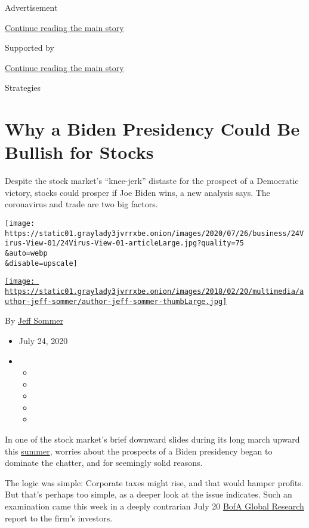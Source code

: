 Advertisement

\protect\hyperlink{after-top}{Continue reading the main story}

Supported by

\protect\hyperlink{after-sponsor}{Continue reading the main story}

Strategies

\hypertarget{why-a-biden-presidency-could-be-bullish-for-stocks}{%
\section{Why a Biden Presidency Could Be Bullish for
Stocks}\label{why-a-biden-presidency-could-be-bullish-for-stocks}}

Despite the stock market's ``knee-jerk'' distaste for the prospect of a
Democratic victory, stocks could prosper if Joe Biden wins, a new
analysis says. The coronavirus and trade are two big factors.

\texttt{[image: https://static01.graylady3jvrrxbe.onion/images/2020/07/26/business/24Virus-View-01/24Virus-View-01-articleLarge.jpg?quality=75\\\&auto=webp\\\&disable=upscale]}

\href{https://www.nytimes3xbfgragh.onion/by/jeff-sommer}{\texttt{[image: https://static01.graylady3jvrrxbe.onion/images/2018/02/20/multimedia/author-jeff-sommer/author-jeff-sommer-thumbLarge.jpg]}}

By \href{https://www.nytimes3xbfgragh.onion/by/jeff-sommer}{Jeff Sommer}

\begin{itemize}
\item
  July 24, 2020
\item
  \begin{itemize}
  \item
  \item
  \item
  \item
  \item
  \end{itemize}
\end{itemize}

In one of the stock market's brief downward slides during its long march
upward this
\href{https://www.nytimes3xbfgragh.onion/2020/07/07/business/wall-street-joe-biden.html}{summer},
worries about the prospects of a Biden presidency began to dominate the
chatter, and for seemingly solid reasons.

The logic was simple: Corporate taxes might rise, and that would hamper
profits. But that's perhaps too simple, as a deeper look at the issue
indicates. Such an examination came this week in a deeply contrarian
July 20
\href{https://www.bofaml.com/en-us/content/market-strategies-insights.html?cm_mmc=GCB-Integrated-_-Google-PS-_-bofa_global_research-_-Brand_General\&gclid=Cj0KCQjwjer4BRCZARIsABK4QeU5ptDZuvjxVvf9x6D3VXH0kNxfFUZPOhTy-730690mmsz2N8xezkwaAjguEALw_wcB\&gclsrc=aw.ds}{BofA
Global Research} report to the firm's investors.

